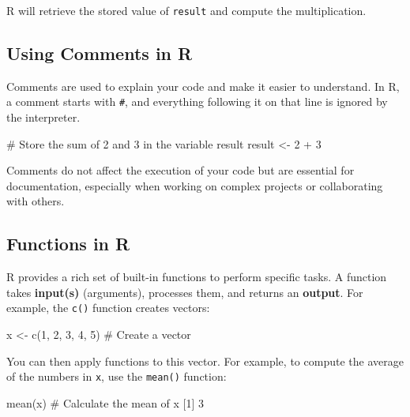 \documentclass[
  11pt,
]{book}
\makeatletter
\newenvironment{Shaded}{}{}
\newcommand{\CommentTok}[1]{\textcolor[rgb]{0.36,0.36,0.36}{#1}}
\newcommand{\DecValTok}[1]{#1}
\newcommand{\FunctionTok}[1]{#1}
\newcommand{\NormalTok}[1]{#1}
\newcommand{\OtherTok}[1]{\textcolor[rgb]{0.39,0.39,0.39}{#1}}
\newcommand{\SpecialCharTok}[1]{\textcolor[rgb]{0.39,0.39,0.39}{#1}}
\newenvironment{kframe}{%
\medskip{}
\setlength{\fboxsep}{.8em}
 \def\at@end@of@kframe{}%
 \ifinner\ifhmode%
  \def\at@end@of@kframe{\end{minipage}}%
  \begin{minipage}{\columnwidth}%
 \fi\fi%
 \def\FrameCommand##1{\hskip\@totalleftmargin \hskip-\fboxsep
 \colorbox{shadecolor}{##1}\hskip-\fboxsep
     \hskip-\linewidth \hskip-\@totalleftmargin \hskip\columnwidth}%
 \MakeFramed {\advance\hsize-\width
   \@totalleftmargin\z@ \linewidth\hsize
   \@setminipage}}%
 {\par\unskip\endMakeFramed%
 \at@end@of@kframe}
\renewenvironment{Shaded}{\begin{kframe}}{\end{kframe}}
\theoremstyle{definition}
\theoremstyle{definition}
\theoremstyle{definition}
\theoremstyle{definition}
\theoremstyle{remark}
\makeatother
\begin{document}
R will retrieve the stored value of \texttt{result} and compute the multiplication.

\subsection*{Using Comments in R}\label{using-comments-in-r}


Comments are used to explain your code and make it easier to understand. In R, a comment starts with \texttt{\#}, and everything following it on that line is ignored by the interpreter.

\begin{Shaded}
\begin{Highlighting}[]
\CommentTok{\# Store the sum of 2 and 3 in the variable \textasciigrave{}result\textasciigrave{}}
\NormalTok{result }\OtherTok{\textless{}{-}} \DecValTok{2} \SpecialCharTok{+} \DecValTok{3}
\end{Highlighting}
\end{Shaded}

Comments do not affect the execution of your code but are essential for documentation, especially when working on complex projects or collaborating with others.

\subsection{Functions in R}\label{functions-in-r}

R provides a rich set of built-in functions to perform specific tasks. A function takes \textbf{input(s)} (arguments), processes them, and returns an \textbf{output}. For example, the \texttt{c()} function creates vectors:

\begin{Shaded}
\begin{Highlighting}[]
\NormalTok{x }\OtherTok{\textless{}{-}} \FunctionTok{c}\NormalTok{(}\DecValTok{1}\NormalTok{, }\DecValTok{2}\NormalTok{, }\DecValTok{3}\NormalTok{, }\DecValTok{4}\NormalTok{, }\DecValTok{5}\NormalTok{)  }\CommentTok{\# Create a vector}
\end{Highlighting}
\end{Shaded}

You can then apply functions to this vector. For example, to compute the average of the numbers in \texttt{x}, use the \texttt{mean()} function:

\begin{Shaded}
\begin{Highlighting}[]
\FunctionTok{mean}\NormalTok{(x)  }\CommentTok{\# Calculate the mean of x}
\NormalTok{   [}\DecValTok{1}\NormalTok{] }\DecValTok{3}
\end{Highlighting}
\end{Shaded}
\end{document}
